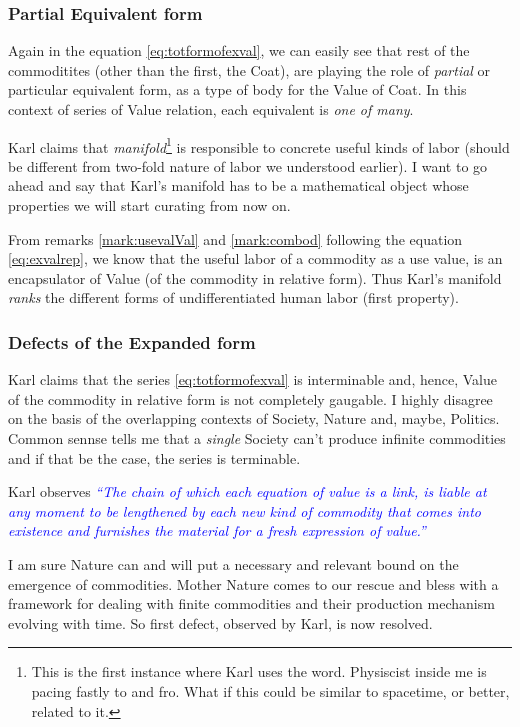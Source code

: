 \documentclass[12pt]{extarticle}
\theoremstyle{definition}
\begin{document}
\subsubsection{Partial Equivalent form}
Again in the equation \ref{eq:totformofexval}, we can easily see that rest of the commoditites (other than the first, the Coat), are playing the role of \emph{partial} or particular equivalent form, as a type of body for the Value of Coat.  In this context of series of Value relation, each equivalent is \emph{one of many}.

Karl claims that \emph{manifold}\footnote{This is the first instance where Karl uses the word.  Physiscist inside me is pacing fastly to and fro.  What if this could be similar to spacetime, or better, related to it.} is responsible to concrete useful kinds of labor (should be different from two-fold nature of labor we understood earlier).  I want to go ahead and say that Karl's manifold has to be a mathematical object whose properties we will start curating from now on.

From remarks \ref{mark:usevalVal} and \ref{mark:combod} following the equation \ref{eq:exvalrep}, we know that the useful labor of a commodity as a use value, is an encapsulator of Value (of the commodity in relative form).  Thus Karl's manifold \emph{ranks} the different forms of undifferentiated human labor (first property).

\subsubsection{Defects of the Expanded form}
Karl claims that the series \ref{eq:totformofexval} is interminable and, hence, Value of the commodity in relative form is not completely gaugable.  I highly disagree on the basis of the overlapping contexts of Society, Nature and, maybe, Politics.  Common sennse tells me that a \emph{single} Society can't produce infinite commodities and if that be the case, the series is terminable.

Karl observes \emph{\textcolor{blue}{``The chain of which each equation of value is a link, is liable at any moment to be lengthened by each new kind of commodity that comes into existence and furnishes the material for a fresh expression of value.''}}

I am sure Nature can and will put a necessary and relevant bound on the emergence of commodities.  Mother Nature comes to our rescue and bless with a framework for dealing with finite commodities and their production mechanism evolving with time.  So first defect, observed by Karl, is now resolved.
\end{document}
